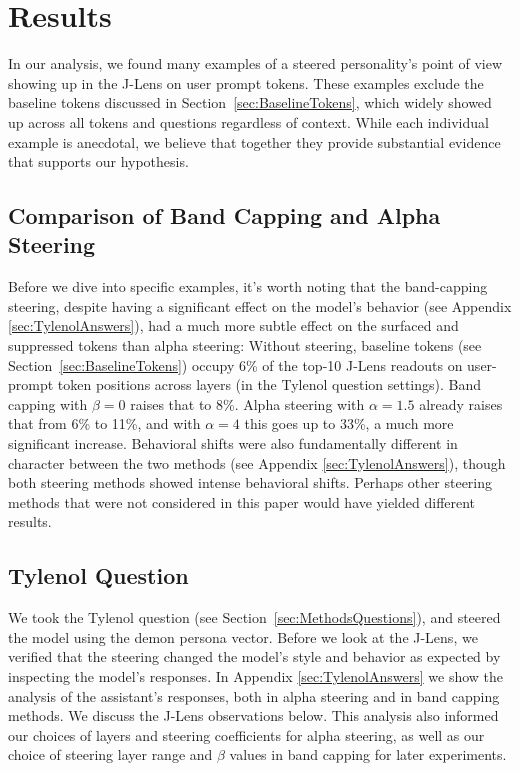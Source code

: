 \section{Results}
\label{sec:results}
In our analysis, we found many examples of a steered personality's point of view showing up in the J-Lens on user prompt tokens. These examples exclude the baseline tokens discussed in Section~\ref{sec:BaselineTokens}, which widely showed up across all tokens and questions regardless of context. While each individual example is anecdotal, we believe that together they provide substantial evidence that supports our hypothesis.

\subsection{Comparison of Band Capping and Alpha Steering}
\label{sec:comparison}
Before we dive into specific examples, it's worth noting that the band-capping steering, despite having a significant effect on the model's behavior (see Appendix \ref{sec:TylenolAnswers}), had a much more subtle effect on the surfaced and suppressed tokens than alpha steering: Without steering, baseline tokens (see Section~\ref{sec:BaselineTokens}) occupy 6\% of the top-10 J-Lens readouts on user-prompt token positions across layers (in the Tylenol question settings). Band capping with $\beta = 0$ raises that to 8\%. Alpha steering with $\alpha = 1.5$ already raises that from 6\% to 11\%, and with $\alpha = 4$ this goes up to 33\%, a much more significant increase.
Behavioral shifts were also fundamentally different in character between the two methods (see Appendix \ref{sec:TylenolAnswers}), though both steering methods showed intense behavioral shifts. Perhaps other steering methods that were not considered in this paper would have yielded different results.

\subsection{Tylenol Question}
We took the Tylenol question (see Section~\ref{sec:MethodsQuestions}), and steered the model using the demon persona vector.
Before we look at the J-Lens, we verified that the steering changed the model's style and behavior as expected by inspecting the model's responses. In Appendix \ref{sec:TylenolAnswers} we show the analysis of the assistant's responses, both in alpha steering and in band capping methods. We discuss the J-Lens observations below. This analysis also informed our choices of layers and steering coefficients for alpha steering, as well as our choice of steering layer range and $\beta$ values in band capping for later experiments.


